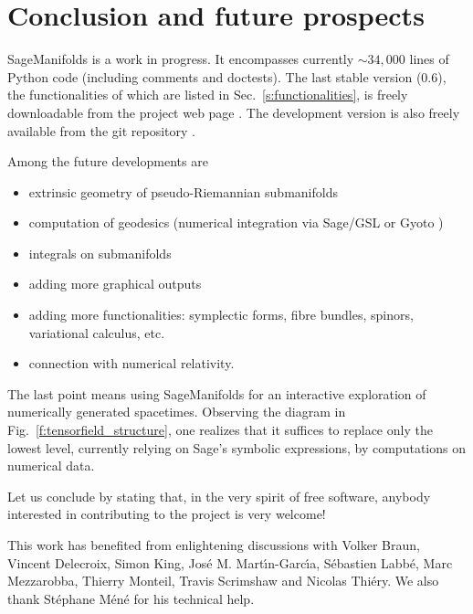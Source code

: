 \documentclass[a4paper]{jpconf}
\newcommand{\soft}[1]{\textsf{#1}}
\newcommand{\Sage}{\soft{Sage}}
\newcommand{\SM}{\soft{SageManifolds}}
\begin{document}

\section{Conclusion and future prospects}

\SM{} is a work in progress. 
It encompasses currently $\sim 34,000$ lines of Python code (including comments and 
doctests). 
The last stable version (0.6), the functionalities of which are 
listed in Sec.~\ref{s:functionalities},
is freely downloadable from the project web page
\cite{SM}. The development version is also freely available 
from the git repository \cite{SM_git}.

Among the future developments are 
\begin{itemize}
\item extrinsic geometry of pseudo-Riemannian submanifolds
\item computation of geodesics (numerical integration via \soft{Sage/GSL} or 
\soft{Gyoto} \cite{Gyoto})
\item integrals on submanifolds
\item adding more graphical outputs
\item adding more functionalities: symplectic forms, fibre bundles, 
spinors, variational calculus, etc.
\item connection with numerical relativity.
\end{itemize}
The last point means using \SM{} for an interactive exploration 
of numerically generated spacetimes. Observing
the diagram in Fig.~\ref{f:tensorfield_structure}, one realizes that it 
suffices to replace only the lowest level, currently relying on
\Sage{}'s symbolic expressions, by computations on numerical data. 

Let us conclude by stating that, in the very spirit of free software, 
anybody interested in contributing to the project is very welcome!


\ack
This work has benefited from enlightening discussions with Volker Braun,
Vincent Delecroix, Simon King,  Jos\'e M. Mart\'\i n-Garc\'\i a, 
S\'ebastien Labb\'e,
Marc Mezzarobba, Thierry Monteil, Travis Scrimshaw and Nicolas Thi\'ery. 
We also thank St\'ephane M\'en\'e for his technical help. 
 
\end{document}
